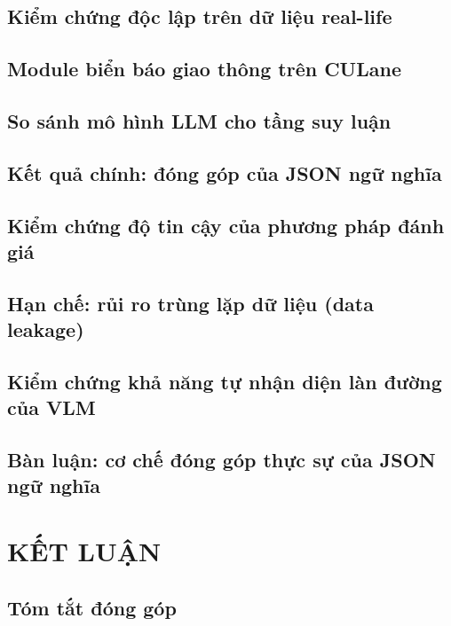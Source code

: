 \documentclass[a4paper,12pt]{report}
\begin{document}
\section{Kiểm chứng độc lập trên dữ liệu real-life}

\section{Module biển báo giao thông trên CULane}

\section{So sánh mô hình LLM cho tầng suy luận}

\section{Kết quả chính: đóng góp của JSON ngữ nghĩa}

\section{Kiểm chứng độ tin cậy của phương pháp đánh giá}

\section{Hạn chế: rủi ro trùng lặp dữ liệu (data leakage)}

\section{Kiểm chứng khả năng tự nhận diện làn đường của VLM}

\section{Bàn luận: cơ chế đóng góp thực sự của JSON ngữ nghĩa}

\chapter{KẾT LUẬN}

\section{Tóm tắt đóng góp}
\end{document}
